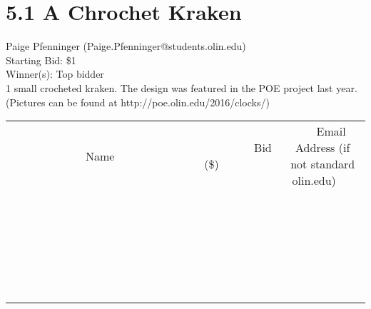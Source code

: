 \documentclass[11pt]{article}
\begin{document}
					\section*{5.1 A Chrochet Kraken}
					Paige Pfenninger (Paige.Pfenninger@students.olin.edu) \\
					Starting Bid: \$1 \\
					Winner(s): Top bidder \\
					1 small crocheted kraken. The design was featured in the POE project last year. (Pictures can be found at http://poe.olin.edu/2016/clocks/) \\
					[6ex]
					\begin{tabular}{c c c}
						~~~~~~~~~~~~~Name~~~~~~~~~~~~~ & ~~~~~~~~~Bid (\$)~~~~~~~~~ & ~~~Email Address (if not standard olin.edu)~~~ \\
				
 & & \\
\hline
 & & \\
\hline
 & & \\
\hline
 & & \\
\hline
 & & \\
\hline
 & & \\
\hline
 & & \\
\hline
 & & \\
\hline
 & & \\
\hline
 & & \\
\hline
 & & \\
\hline
 & & \\
\hline
 & & \\
\hline
 & & \\
\hline
 & & \\
\hline
 & & \\
\hline
 & & \\
\hline
 & & \\
\hline
 & & \\
\hline
 & & \\
\hline
 & & \\
\hline
 & & \\
\hline
 & & \\
\hline
 & & \\
\hline
 & & \\
\hline
 & & \\
\hline
					\end{tabular}
					\clearpage
				
\end{document}
